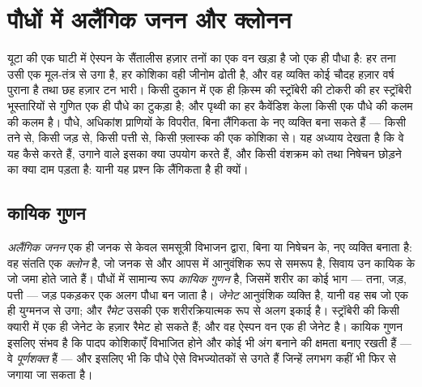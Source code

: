\chapter{पौधों में अलैंगिक जनन और क्लोनन}\label{ch:b2:asexual-reproduction}

यूटा की एक घाटी में ऐस्पन के सैंतालीस हज़ार तनों का एक वन खड़ा है जो एक
ही पौधा है: हर तना उसी एक मूल-तंत्र से उगा है, हर कोशिका वही जीनोम ढोती
है, और वह व्यक्ति कोई चौदह हज़ार वर्ष पुराना है तथा छह हज़ार टन भारी।
किसी दुकान में एक ही क़िस्म की स्ट्रॉबेरी की टोकरी की हर स्ट्रॉबेरी
भूस्तारियों से गुणित एक ही पौधे का टुकड़ा है; और पृथ्वी का हर कैवेंडिश
केला किसी एक पौधे की कलम की कलम है। पौधे, अधिकांश प्राणियों के विपरीत,
बिना लैंगिकता के नए व्यक्ति बना सकते हैं --- किसी तने से, किसी जड़ से,
किसी पत्ती से, किसी फ़्लास्क की एक कोशिका से। यह अध्याय देखता है कि वे
यह कैसे करते हैं, उगाने वाले इसका क्या उपयोग करते हैं, और किसी वंशक्रम
को  तथा निषेचन छोड़ने का क्या दाम पड़ता है: यानी यह
प्रश्न कि लैंगिकता है ही क्यों।

\section{कायिक गुणन}

\begin{definition}[क्लोन, जेनेट, रैमेट]\label{def:b2:asexual-reproduction:clone}
\emph{अलैंगिक जनन} एक ही जनक से केवल समसूत्री विभाजन द्वारा, बिना
 या निषेचन के, नए व्यक्ति बनाता है: वह संतति
एक \emph{क्लोन} है, जो जनक से और आपस में आनुवंशिक रूप से समरूप है, सिवाय
उन कायिक  के जो जमा होते जाते हैं। पौधों में
सामान्य रूप \emph{कायिक गुणन} है, जिसमें शरीर का कोई भाग --- तना, जड़,
पत्ती --- जड़ पकड़कर एक अलग पौधा बन जाता है।
\emph{जेनेट} आनुवंशिक व्यक्ति है, यानी वह सब जो एक ही युग्मनज से उगा;
और \emph{रैमेट} उसकी एक शरीरक्रियात्मक रूप से अलग इकाई है।
स्ट्रॉबेरी की किसी क्यारी में एक ही जेनेट के हज़ार रैमेट हो सकते हैं; और
वह ऐस्पन वन एक ही जेनेट है। कायिक गुणन इसलिए संभव है कि पादप कोशिकाएँ
विभाजित होने और कोई भी अंग बनाने की क्षमता बनाए रखती हैं
--- वे \emph{पूर्णशक्त} हैं --- और इसलिए भी कि पौधे ऐसे
विभज्योतकों से उगते हैं जिन्हें लगभग कहीं भी फिर से जगाया जा सकता है।
\end{definition}

